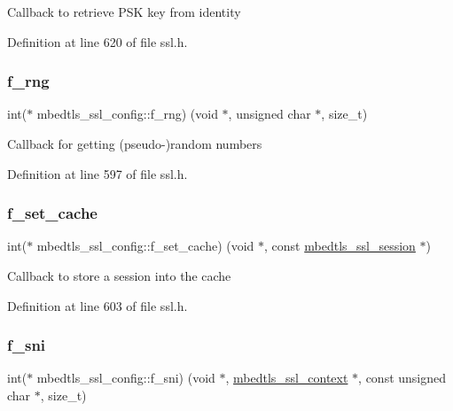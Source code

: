 Callback to retrieve P\+SK key from identity 

Definition at line 620 of file ssl.\+h.

\mbox{\label{structmbedtls__ssl__config_a9250c08f11a4e549b6f9d48ba9a977d1}} 
\subsubsection{\texorpdfstring{f\+\_\+rng}{f\_rng}}
{\footnotesize\ttfamily int($\ast$ mbedtls\+\_\+ssl\+\_\+config\+::f\+\_\+rng) (void $\ast$, unsigned char $\ast$, size\+\_\+t)}

Callback for getting (pseudo-\/)random numbers 

Definition at line 597 of file ssl.\+h.

\mbox{\label{structmbedtls__ssl__config_a2664effc0267e63b27cc95eea8213865}} 
\subsubsection{\texorpdfstring{f\+\_\+set\+\_\+cache}{f\_set\_cache}}
{\footnotesize\ttfamily int($\ast$ mbedtls\+\_\+ssl\+\_\+config\+::f\+\_\+set\+\_\+cache) (void $\ast$, const \mbox{\hyperlink{structmbedtls__ssl__session}{mbedtls\+\_\+ssl\+\_\+session}} $\ast$)}

Callback to store a session into the cache 

Definition at line 603 of file ssl.\+h.

\mbox{\label{structmbedtls__ssl__config_a00e330604cc40f0097b5f8ad3fb7b297}} 
\subsubsection{\texorpdfstring{f\+\_\+sni}{f\_sni}}
{\footnotesize\ttfamily int($\ast$ mbedtls\+\_\+ssl\+\_\+config\+::f\+\_\+sni) (void $\ast$, \mbox{\hyperlink{structmbedtls__ssl__context}{mbedtls\+\_\+ssl\+\_\+context}} $\ast$, const unsigned char $\ast$, size\+\_\+t)}

